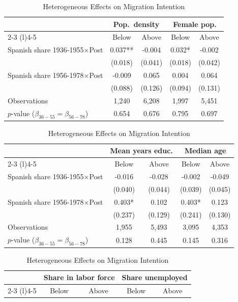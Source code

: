 \begin{table}[!h]
\centering
\renewcommand{\arraystretch}{0.98}
\setlength{\tabcolsep}{8pt}
\captionsetup{justification=centering}
\caption{Heterogeneous Effects on Migration Intention}
\begin{tabular*}{\textwidth}{l@{\extracolsep{\fill}}cccc}
\hline
& \multicolumn{2}{c}{Pop.\ density} & \multicolumn{2}{c}{Female pop.} \\
\cmidrule(l){2-3} \cmidrule(l){4-5}
& Below & Above & Below & Above \\
\hline
Spanish share 1936-1955$\times$Post & 0.037** & -0.004 & 0.032* & -0.002 \\
 & (0.018) & (0.041) & (0.018) & (0.042) \\
Spanish share 1956-1978$\times$Post & -0.009 & 0.065 & 0.004 & 0.064 \\
  & (0.088) & (0.126) & (0.094) & (0.131) \\
\addlinespace
Observations & 1,240 & 6,208 & 1,997 & 5,451 \\
$p$-value ($\beta_{36{-}55} = \beta_{56{-}78}$) & 0.654 & 0.676 & 0.795 & 0.697 \\
\hline
\end{tabular*}
\begin{tabular*}{\textwidth}{l@{\extracolsep{\fill}}cccc}
& \multicolumn{2}{c}{Mean years educ.} & \multicolumn{2}{c}{Median age} \\
\cmidrule(l){2-3} \cmidrule(l){4-5}
& Below & Above & Below & Above \\
\hline
Spanish share 1936-1955$\times$Post & -0.016 & -0.028 & -0.002 & -0.049 \\
 & (0.040) & (0.044) & (0.039) & (0.045) \\
Spanish share 1956-1978$\times$Post & 0.403* & 0.102 & 0.403* & 0.123 \\
  & (0.237) & (0.129) & (0.241) & (0.130) \\
\addlinespace
Observations & 1,955 & 5,493 & 3,095 & 4,353 \\
$p$-value ($\beta_{36{-}55} = \beta_{56{-}78}$) & 0.128 & 0.445 & 0.145 & 0.316 \\
\hline
\end{tabular*}
\begin{tabular*}{\textwidth}{l@{\extracolsep{\fill}}cccc}
& \multicolumn{2}{c}{Share in labor force} & \multicolumn{2}{c}{Share unemployed} \\
\cmidrule(l){2-3} \cmidrule(l){4-5}
& Below & Above & Below & Above \\
\hline

\end{tabular*}
\end{table}
